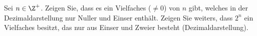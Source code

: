 
\begin{exercise}

Sei $n \in \Z^+$. Zeigen Sie, dass es ein Vielfaches ($\neq 0$)
von $n$ gibt, welches in der Dezimaldarstellung nur Nuller und Einser
enthält. Zeigen Sie weiters, dass $2^n$ ein Vielfaches besitzt, das nur
aus Einser und Zweier besteht (Dezimaldarstellung).

\end{exercise}


\begin{solution}

\phantom{}

\end{solution}

